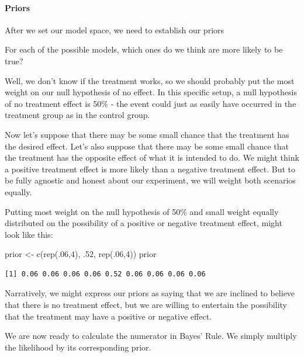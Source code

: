 \documentclass[
  letterpaper,
  DIV=11,
  numbers=noendperiod,
  oneside]{scrartcl}
\let\oldparagraph\paragraph
\renewcommand{\paragraph}[1]{\oldparagraph{#1}\mbox{}}
\newenvironment{Shaded}{\begin{snugshade}}{\end{snugshade}}
\newcommand{\DecValTok}[1]{\textcolor[rgb]{0.68,0.00,0.00}{#1}}
\newcommand{\FunctionTok}[1]{\textcolor[rgb]{0.28,0.35,0.67}{#1}}
\newcommand{\NormalTok}[1]{\textcolor[rgb]{0.00,0.23,0.31}{#1}}
\newcommand{\OtherTok}[1]{\textcolor[rgb]{0.00,0.23,0.31}{#1}}
\begin{document}
\hypertarget{priors}{%
\paragraph{Priors}\label{priors}}

After we set our model space, we need to establish our priors

For each of the possible models, which ones do we think are more likely
to be true?

Well, we don't know if the treatment works, so we should probably put
the most weight on our null hypothesis of no effect. In this specific
setup, a null hypothesis of no treatment effect is 50\% - the event
could just as easily have occurred in the treatment group as in the
control group.

Now let's suppose that there may be some small chance that the treatment
has the desired effect. Let's also suppose that there may be some small
chance that the treatment has the opposite effect of what it is intended
to do. We might think a positive treatment effect is more likely than a
negative treatment effect. But to be fully agnostic and honest about our
experiment, we will weight both scenarios equally.

Putting most weight on the null hypothesis of 50\% and small weight
equally distributed on the possibility of a positive or negative
treatment effect, might look like this:

\begin{Shaded}
\begin{Highlighting}[]
\NormalTok{prior }\OtherTok{\textless{}{-}} \FunctionTok{c}\NormalTok{(}\FunctionTok{rep}\NormalTok{(.}\DecValTok{06}\NormalTok{,}\DecValTok{4}\NormalTok{), .}\DecValTok{52}\NormalTok{, }\FunctionTok{rep}\NormalTok{(.}\DecValTok{06}\NormalTok{,}\DecValTok{4}\NormalTok{))}
\NormalTok{prior}
\end{Highlighting}
\end{Shaded}

\begin{verbatim}
[1] 0.06 0.06 0.06 0.06 0.52 0.06 0.06 0.06 0.06
\end{verbatim}

Narratively, we might express our priors as saying that we are inclined
to believe that there is no treatment effect, but we are willing to
entertain the possibility that the treatment may have a positive or
negative effect.

We are now ready to calculate the numerator in Bayes' Rule. We simply
multiply the likelihood by its corresponding prior.
\end{document}
